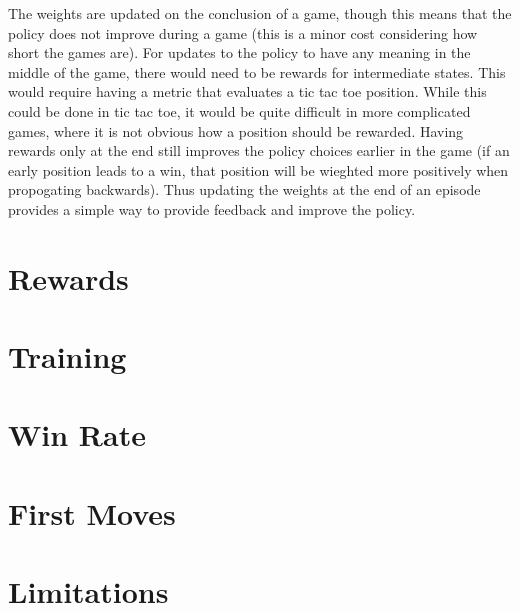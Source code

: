 \documentclass{article}
\begin{document}
   The weights are updated on the conclusion of a game, though this means that the policy does not improve
   during a game (this is a minor cost considering how short the games are). For updates to the policy to have
   any meaning in the middle of the game, there would need to be rewards for intermediate states. This would
   require having a metric that evaluates a tic tac toe position. While this could be done in tic tac toe,
   it would be quite difficult in more complicated games, where it is not obvious how a position should be
   rewarded. Having rewards only at the end still improves the policy choices earlier in the game (if an early
   position leads to a win, that position will be wieghted more positively when propogating backwards).
   Thus updating the weights at the end of an episode provides a simple way to provide feedback and improve the
   policy.

   \section{Rewards}
   \section{Training}
   \section{Win Rate}
   \section{First Moves}
   \section{Limitations}
\end{document}
